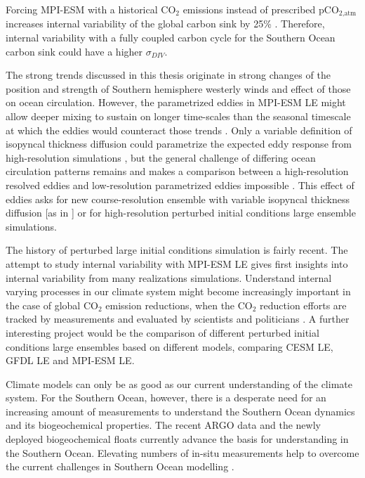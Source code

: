 Forcing \acs{MPI-ESM} with a historical CO$_2$ emissions instead of prescribed pCO$_{\text{2,atm}}$ increases internal variability of the global carbon sink by 25\% \citep{Ilyina2013}. Therefore, internal variability with a fully coupled carbon cycle for the Southern Ocean carbon sink could have a higher $\sigma_{DIV}$. 

The strong trends discussed in this thesis originate in strong changes of the position and strength of Southern hemisphere westerly winds and effect of those on ocean circulation. However, the parametrized eddies in \acs{MPI-ESM LE} might allow deeper mixing to sustain on longer time-scales than the seasonal timescale at which the eddies would counteract those trends \citep{Thompson2011}. Only a variable definition of isopyncal thickness diffusion could parametrize the expected eddy response from high-resolution simulations \citep{Gent2011,Lovenduski2013}, but the general challenge of differing ocean circulation patterns remains and makes a comparison between a high-resolution resolved eddies and low-resolution parametrized eddies impossible \citep{Bryan2014}. This effect of eddies asks for new course-resolution ensemble with variable isopyncal thickness diffusion [as in \cite{Lovenduski2013}] or for high-resolution perturbed initial conditions large ensemble simulations.\newline


The history of perturbed large initial conditions simulation is fairly recent. The attempt to study internal variability with \acs{MPI-ESM LE} gives first insights into internal variability from many realizations simulations. Understand internal varying processes in our climate system might become increasingly important in the case of global CO$_2$ emission reductions, when the CO$_2$ reduction efforts are tracked by measurements and evaluated by scientists and politicians \citep{Hawkins2009,Lovenduski2015,Marotzke2017}. A further interesting project would be the comparison of different perturbed initial conditions large ensembles based on different models, \ie comparing \acs{CESM} \acs{LE}, \acs{GFDL} \acs{LE} and \acs{MPI-ESM LE}.\newline

Climate models can only be as good as our current understanding of the climate system. For the Southern Ocean, however, there is a desperate need for an increasing amount of measurements to understand the Southern Ocean dynamics and its biogeochemical properties. The recent ARGO data and the newly deployed biogeochemical floats currently advance the basis for understanding in the Southern Ocean. Elevating  numbers of in-situ measurements help to overcome the current challenges in Southern Ocean modelling \citep{Sallee2013,Sallee2013a,Jungclaus2013,Haumann2014,Stoessel2015,Haumann2016}.   
